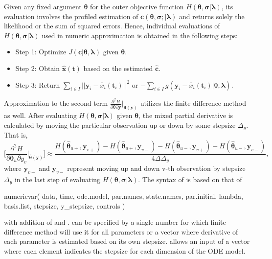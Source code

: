 Given any fixed argument $\bm{\theta}$ for the outer objective function $H(\bm{\theta},\bm{\sigma}|\bm{\lambda})$, its evaluation involves the profiled estimation of $\bm{c}(\bm{\theta},\bm{\sigma};|\bm{\lambda})$ and returns solely the likelihood or the sum of squared errors. Hence, individual evaluations of $H(\bm{\theta},\bm{\sigma}|\bm{\lambda})$ used in numeric approximation is obtained in the following steps:
\begin{itemize}
  \item Step 1: Optimize $J(\bm{c}|\bm{\theta},\bm{\lambda})$ given $\bm{\theta}$.
  \item Step 2: Obtain $\hat{\bm{x}}(\bm{t})$ based on the estimated $\hat{\bm{c}}$.
  \item Step 3: Return $\sum_{i \in I} ||\bm{y}_{i} - \hat{x}_{i}(\bm{t}_i)||^{2}$ or $-\sum_{i \in I}g(\bm{y}_{i} - \hat{x}_{i}(\bm{t}_i)|\bm{\theta},\bm{\lambda})$.
  \end{itemize}
Approximation to the second term $\frac{\partial^{2}H}{\partial\bm{\theta}\partial\bm{y}}\bigg\vert_{\bm{\hat{\theta}}(\bm{y})}$ utilizes the finite difference method as well. After evaluating $H(\bm{\theta},\bm{\sigma}|\bm{\lambda})$ given $\bm{\theta}$, the mixed partial derivative is calculated by moving the particular observation up or down by some stepsize $\Delta_{y}$. That is,
\begin{equation*}
\bigg[\frac{\partial^{2}H}{\partial\bm{\theta}_{u}\partial y_{v}}\bigg\vert_{\bm{\hat{\theta}}(\bm{y})} \bigg] \approx \frac{H(\hat{\bm{\theta}}_{u+},\bm{y}_{v+}) - H(\hat{\bm{\theta}}_{u+},\bm{y}_{v-}) - H(\hat{\bm{\theta}}_{u-},\bm{y}_{v+}) +H(\hat{\bm{\theta}}_{u-},\bm{y}_{v-})}{4\Delta\Delta_{y}},
\end{equation*}
where $\bm{y}_{v+}$ and $\bm{y}_{v-}$ represent moving up and down v-th observation by stepsize $\Delta_{y}$ in the last step of evaluating $H(\bm{\theta},\bm{\sigma}|\bm{\lambda})$.  
The syntax of  is based on that of 

\begin{example*}
numericvar(
  data, time, ode.model, par.names, state.names,
  par.initial, lambda, basis.list, stepsize, y_stepsize, controls
)
\end{example*}

with addition of  and .  can be specified by a single number for which finite difference method will use it for all parameters or a vector where derivative of each parameter is estimated based on its own stepsize.  allows an input of a vector where each element indicates the stepsize for each dimension of the ODE model. 
